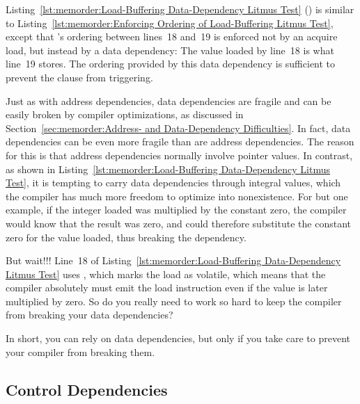 Listing~\ref{lst:memorder:Load-Buffering Data-Dependency Litmus Test}
()
is similar to
Listing~\ref{lst:memorder:Enforcing Ordering of Load-Buffering Litmus Test},
except that 's ordering between lines~18 and~19 is
enforced not by an acquire load, but instead by a data dependency:
The value loaded by line~18 is what line~19 stores.
The ordering provided by this data dependency is sufficient to prevent
the  clause from triggering.

Just as with address dependencies, data dependencies are
fragile and can be easily broken by compiler optimizations, as discussed in
Section~\ref{sec:memorder:Address- and Data-Dependency Difficulties}.
In fact, data dependencies can be even more fragile than are address
dependencies.
The reason for this is that address dependencies normally involve
pointer values.
In contrast, as shown in
Listing~\ref{lst:memorder:Load-Buffering Data-Dependency Litmus Test},
it is tempting to carry data dependencies through integral values,
which the compiler has much more freedom to optimize into nonexistence.
For but one example, if the integer loaded was multiplied by the constant
zero, the compiler would know that the result was zero, and could therefore
substitute the constant zero for the value loaded, thus breaking
the dependency.

\QuickQuiz{}
	But wait!!!
	Line~18 of
	Listing~\ref{lst:memorder:Load-Buffering Data-Dependency Litmus Test}
	uses , which marks the load as volatile,
	which means that the compiler absolutely must emit the load
	instruction even if the value is later multiplied by zero.
	So do you really need to work so hard to keep the compiler from
	breaking your data dependencies?
 \QuickQuizEnd

In short, you can rely on data dependencies, but only if you take care
to prevent your compiler from breaking them.

\subsection{Control Dependencies}
\label{sec:memorder:Control Dependencies}

